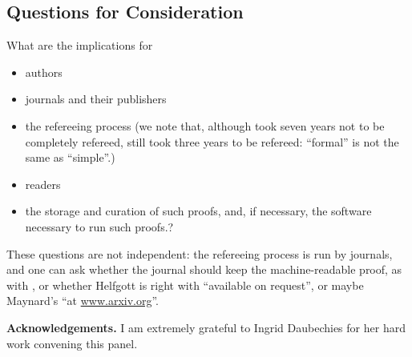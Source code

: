 \subsection{Questions for Consideration}
What are the implications for
\begin{itemize}
\item authors
\item journals and their publishers
\item the refereeing process (we note that, although \cite{Hales2005} took seven years not to be completely refereed,  \cite{Halesetal2017a} still took three years to be refereed: ``formal'' is not the same as ``simple''.) %
\item readers
\item the storage and curation of such proofs, and, if necessary, the software necessary to run such proofs.?%
\end{itemize}
These questions are not independent: the refereeing process is run by journals, and one can ask whether the journal should keep the machine-readable proof, as with \cite{Hales2005}, or whether Helfgott is right with ``available on request'', or maybe Maynard's ``at \url{www.arxiv.org}''.
\par
{\bf Acknowledgements.} I am extremely grateful to Ingrid Daubechies for her hard work convening this panel.

